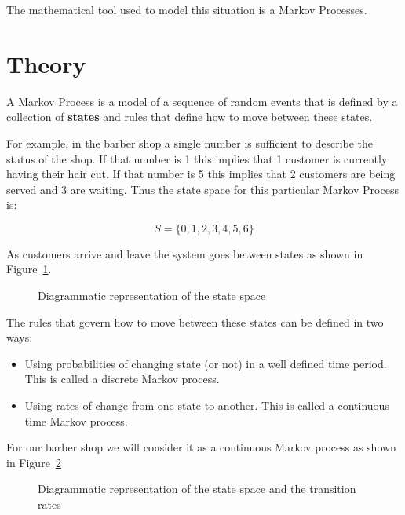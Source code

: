 The mathematical tool used to model this situation is a Markov Processes.

\section{Theory}\label{sec:theory}

A Markov Process is a model of a sequence of random events that is defined by a
collection of \textbf{states} and rules that define how to move between these
states.

For example, in the barber shop a single number is sufficient to describe the
status of the shop. If that number is 1 this implies that 1 customer is
currently having their hair cut. If that number is 5 this implies that 2
customers are being served and 3 are waiting. Thus the state space for this
particular Markov Process is:

\begin{equation}
    S = \{0, 1, 2, 3, 4, 5, 6\}
    \label{eqn:barber_shop_state_space}
\end{equation}

As customers arrive and leave the system goes between states as shown in
Figure~\ref{fig:barber-shop-birth-death-no-rates}.

\begin{figure}[!hbtp]
    \begin{center}
    
    \end{center}
    \caption{Diagrammatic representation of the state space}
    \label{fig:barber-shop-birth-death-no-rates}
\end{figure}

The rules that govern how to move between these states can be defined in two
ways:

\begin{itemize}
    \item Using probabilities of changing state (or not) in a well defined time
        period.  This is called a discrete Markov process.
    \item Using rates of change from one state to another. This is called a
        continuous time Markov process.
\end{itemize}

For our barber shop we will consider it as a continuous Markov process as shown
in Figure~\ref{fig:barber-shop-continuous-markov-process}

\begin{figure}[!hbtp]
    \begin{center}
    
    \end{center}
    \caption{Diagrammatic representation of the state space and the transition
    rates}
    \label{fig:barber-shop-continuous-markov-process}
\end{figure}

